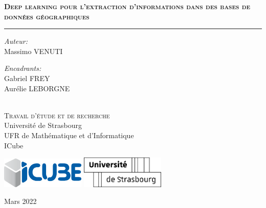 \begin{titlepage}
  \doublespacing
  \large
  \hfill
  \vfill
  \vspace*{0.5cm}
  \begin{center}
    \doublespacing
    {\huge\textbf{\textsc{Deep learning pour l’extraction d’informations dans des bases de données géographiques}}}
  \end{center}
  \vspace{1.25cm}
  \hrule
  \vspace{1.5cm}
  \onehalfspacing
  \begin{center}

    \begin{minipage}[t]{0.5\textwidth}
      \begin{flushleft}
        \emph{Auteur:}\\
        Massimo \textsc{VENUTI}
      \end{flushleft}
    \end{minipage}
    \begin{minipage}[t]{0.4\textwidth}
      \begin{flushright}
        \emph{Encadrants:} \\
        Gabriel \textsc{FREY}\\
        Aurélie \textsc{LEBORGNE}\\
      \end{flushright}
    \end{minipage}\\[1.5cm]

    {\LARGE{\textsc{Travail d'étude et de recherche}}}\\[1cm]

    Université de Strasbourg\\
    UFR de Mathématique et d’Informatique\\
    ICube

    \hfill
    \vfill


    \begin{center}
        \includegraphics[width=4cm]{images/icube}
        \hspace{2em}
        \includegraphics[width=4cm]{images/unistra}
    \end{center}

    \hfill
    \vfill

    Mars 2022
  \end{center}
\end{titlepage}
